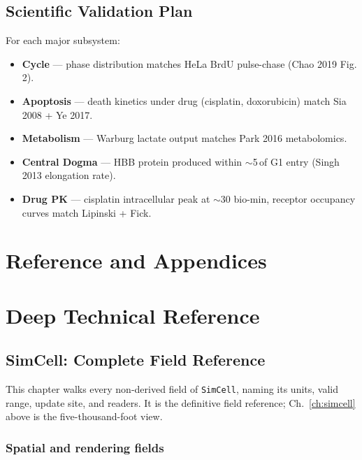 \documentclass[11pt,letterpaper,twoside,openany]{book}
\newcommand{\code}[1]{\texttt{#1}}
\newcommand{\biomin}{\text{bio-min}}
\begin{document}
\chapter{Scientific Validation Plan}
\label{ch:validation}

For each major subsystem:
\begin{itemize}
  \item \textbf{Cycle} --- phase distribution matches HeLa BrdU
        pulse-chase (Chao 2019 Fig. 2).
  \item \textbf{Apoptosis} --- death kinetics under drug (cisplatin,
        doxorubicin) match Sia 2008 + Ye 2017.
  \item \textbf{Metabolism} --- Warburg lactate output matches
        Park 2016 metabolomics.
  \item \textbf{Central Dogma} --- HBB protein produced within
        $\sim$5\,\biomin of G1 entry (Singh 2013 elongation rate).
  \item \textbf{Drug PK} --- cisplatin intracellular peak at $\sim$30
        bio-min, receptor occupancy curves match Lipinski + Fick.
\end{itemize}

\part{Reference and Appendices}

\part{Deep Technical Reference}

\chapter{SimCell: Complete Field Reference}
\label{ch:simcell-deep}

This chapter walks every non-derived field of \code{SimCell}, naming
its units, valid range, update site, and readers. It is the
definitive field reference; Ch.~\ref{ch:simcell} above is the
five-thousand-foot view.

\section{Spatial and rendering fields}
\end{document}
